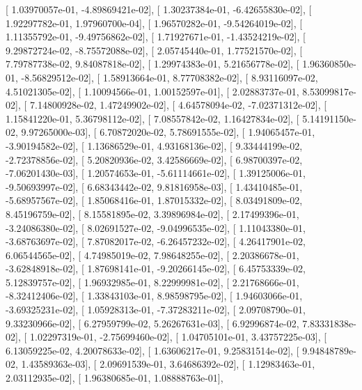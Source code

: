 \documentclass{article}
\begin{document}
       [  1.03970057e-01,  -4.89869421e-02],
       [  1.30237384e-01,  -6.42655830e-02],
       [  1.92297782e-01,   1.97960700e-04],
       [  1.96570282e-01,  -9.54264019e-02],
       [  1.11355792e-01,  -9.49756862e-02],
       [  1.71927671e-01,  -1.43524219e-02],
       [  9.29872724e-02,  -8.75572088e-02],
       [  2.05745440e-01,   1.77521570e-02],
       [  7.79787738e-02,   9.84087818e-02],
       [  1.29974383e-01,   5.21656778e-02],
       [  1.96360850e-01,  -8.56829512e-02],
       [  1.58913664e-01,   8.77708382e-02],
       [  8.93116097e-02,   4.51021305e-02],
       [  1.10094566e-01,   1.00152597e-01],
       [  2.02883737e-01,   8.53099817e-02],
       [  7.14800928e-02,   1.47249902e-02],
       [  4.64578094e-02,  -7.02371312e-02],
       [  1.15841220e-01,   5.36798112e-02],
       [  7.08557842e-02,   1.16427834e-02],
       [  5.14191150e-02,   9.97265000e-03],
       [  6.70872020e-02,   5.78691555e-02],
       [  1.94065457e-01,  -3.90194582e-02],
       [  1.13686529e-01,   4.93168136e-02],
       [  9.33444199e-02,  -2.72378856e-02],
       [  5.20820936e-02,   3.42586669e-02],
       [  6.98700397e-02,  -7.06201430e-03],
       [  1.20574653e-01,  -5.61114661e-02],
       [  1.39125006e-01,  -9.50693997e-02],
       [  6.68343442e-02,   9.81816958e-03],
       [  1.43410485e-01,  -5.68957567e-02],
       [  1.85068416e-01,   1.87015332e-02],
       [  8.03491809e-02,   8.45196759e-02],
       [  8.15581895e-02,   3.39896984e-02],
       [  2.17499396e-01,  -3.24086380e-02],
       [  8.02691527e-02,  -9.04996535e-02],
       [  1.11043380e-01,  -3.68763697e-02],
       [  7.87082017e-02,  -6.26457232e-02],
       [  4.26417901e-02,   6.06544565e-02],
       [  4.74985019e-02,   7.98648255e-02],
       [  2.20386678e-01,  -3.62848918e-02],
       [  1.87698141e-01,  -9.20266145e-02],
       [  6.45753339e-02,   5.12839757e-02],
       [  1.96932985e-01,   8.22999981e-02],
       [  2.21768666e-01,  -8.32412406e-02],
       [  1.33843103e-01,   8.98598795e-02],
       [  1.94603066e-01,  -3.69325231e-02],
       [  1.05928313e-01,  -7.37283211e-02],
       [  2.09708790e-01,   9.33230966e-02],
       [  6.27959799e-02,   5.26267631e-03],
       [  6.92996874e-02,   7.83331838e-02],
       [  1.02297319e-01,  -2.75699460e-02],
       [  1.04705101e-01,   3.43757225e-03],
       [  6.13059225e-02,   4.20078633e-02],
       [  1.63606217e-01,   9.25831514e-02],
       [  9.94848789e-02,   1.43589363e-03],
       [  2.09691539e-01,   3.64686392e-02],
       [  1.12983463e-01,   2.03112935e-02],
       [  1.96380685e-01,   1.08888763e-01],
\end{document}
